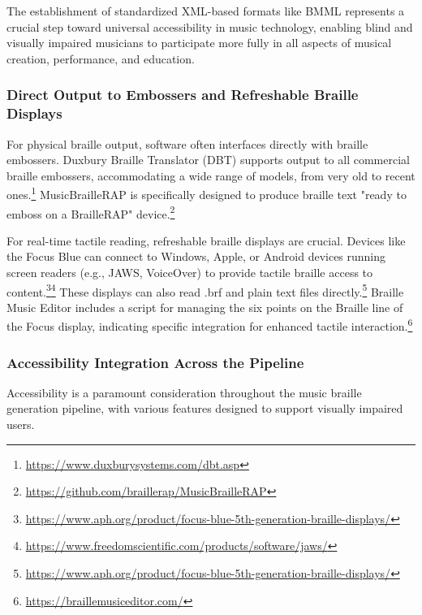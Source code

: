 The establishment of standardized XML-based formats like BMML represents a crucial step toward universal accessibility in music technology, enabling blind and visually impaired musicians to participate more fully in all aspects of musical creation, performance, and education.
\subsubsection{Direct Output to Embossers and Refreshable Braille Displays}
For physical braille output, software often interfaces directly with braille embossers. Duxbury Braille Translator (DBT) supports output to all commercial braille embossers, accommodating a wide range of models, from very old to recent ones.\footnote{\url{https://www.duxburysystems.com/dbt.asp}} MusicBrailleRAP is specifically designed to produce braille text "ready to emboss on a BrailleRAP" device.\footnote{\url{https://github.com/braillerap/MusicBrailleRAP}}

For real-time tactile reading, refreshable braille displays are crucial. Devices like the Focus Blue can connect to Windows, Apple, or Android devices running screen readers (e.g., JAWS, VoiceOver) to provide tactile braille access to content.\footnote{\url{https://www.aph.org/product/focus-blue-5th-generation-braille-displays/}}\footnote{\url{https://www.freedomscientific.com/products/software/jaws/}} These displays can also read .brf and plain text files directly.\footnote{\url{https://www.aph.org/product/focus-blue-5th-generation-braille-displays/}} Braille Music Editor includes a script for managing the six points on the Braille line of the Focus display, indicating specific integration for enhanced tactile interaction.\footnote{\url{https://braillemusiceditor.com/}}

\subsubsection{Accessibility Integration Across the Pipeline}
Accessibility is a paramount consideration throughout the music braille generation pipeline, with various features designed to support visually impaired users.

